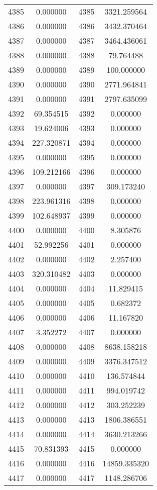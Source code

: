 \documentclass[12pt]{article}
\begin{document}
\begin{longtable}{@{}cccc@{}}
4385 & 0.000000 & 4385 & 3321.259564 \\
4386 & 0.000000 & 4386 & 3432.370464 \\
4387 & 0.000000 & 4387 & 3464.436061 \\
4388 & 0.000000 & 4388 & 79.764488 \\
4389 & 0.000000 & 4389 & 100.000000 \\
4390 & 0.000000 & 4390 & 2771.964841 \\
4391 & 0.000000 & 4391 & 2797.635099 \\
4392 & 69.354515 & 4392 & 0.000000 \\
4393 & 19.624006 & 4393 & 0.000000 \\
4394 & 227.320871 & 4394 & 0.000000 \\
4395 & 0.000000 & 4395 & 0.000000 \\
4396 & 109.212166 & 4396 & 0.000000 \\
4397 & 0.000000 & 4397 & 309.173240 \\
4398 & 223.961316 & 4398 & 0.000000 \\
4399 & 102.648937 & 4399 & 0.000000 \\
4400 & 0.000000 & 4400 & 8.305876 \\
4401 & 52.992256 & 4401 & 0.000000 \\
4402 & 0.000000 & 4402 & 2.257400 \\
4403 & 320.310482 & 4403 & 0.000000 \\
4404 & 0.000000 & 4404 & 11.829415 \\
4405 & 0.000000 & 4405 & 0.682372 \\
4406 & 0.000000 & 4406 & 11.167820 \\
4407 & 3.352272 & 4407 & 0.000000 \\
4408 & 0.000000 & 4408 & 8638.158218 \\
4409 & 0.000000 & 4409 & 3376.347512 \\
4410 & 0.000000 & 4410 & 136.574844 \\
4411 & 0.000000 & 4411 & 994.019742 \\
4412 & 0.000000 & 4412 & 303.252239 \\
4413 & 0.000000 & 4413 & 1806.386551 \\
4414 & 0.000000 & 4414 & 3630.213266 \\
4415 & 70.831393 & 4415 & 0.000000 \\
4416 & 0.000000 & 4416 & 14859.335320 \\
4417 & 0.000000 & 4417 & 1148.286706 \\

\end{longtable}
\end{document}
